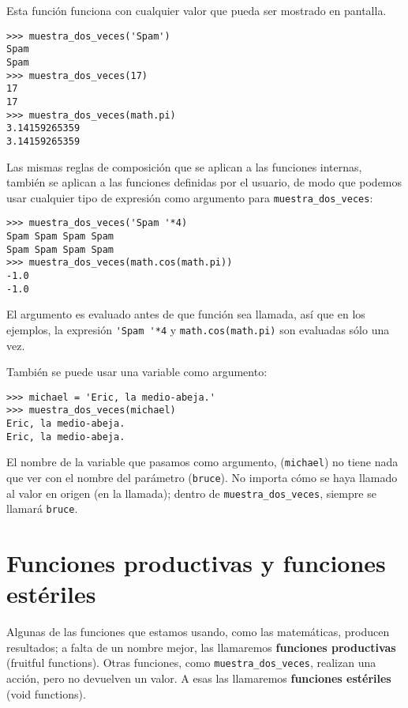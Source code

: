 Esta función funciona con cualquier valor que pueda ser mostrado en pantalla.

\beforeverb
\begin{verbatim}
>>> muestra_dos_veces('Spam')
Spam
Spam
>>> muestra_dos_veces(17)
17
17
>>> muestra_dos_veces(math.pi)
3.14159265359
3.14159265359
\end{verbatim}
\afterverb
%
Las mismas reglas de composición que se aplican a las funciones internas, también
se aplican a las funciones definidas por el usuario, de modo que podemos usar cualquier tipo
de expresión como argumento para \verb"muestra_dos_veces":


\beforeverb
\begin{verbatim}
>>> muestra_dos_veces('Spam '*4)
Spam Spam Spam Spam
Spam Spam Spam Spam
>>> muestra_dos_veces(math.cos(math.pi))
-1.0
-1.0
\end{verbatim}
\afterverb
%
El argumento es evaluado antes de que función sea llamada, así
que en los ejemplos, la expresión \verb"'Spam '*4" y
{\tt math.cos(math.pi)} son evaluadas sólo una vez.


También se puede usar una variable como argumento:

\beforeverb
\begin{verbatim}
>>> michael = 'Eric, la medio-abeja.'
>>> muestra_dos_veces(michael)
Eric, la medio-abeja.
Eric, la medio-abeja.
\end{verbatim}
\afterverb
%
El nombre de la variable que pasamos como argumento, ({\tt michael}) no
tiene nada que ver con el nombre del parámetro ({\tt bruce}). No
importa cómo se haya llamado al valor en origen (en la llamada);
dentro de \verb"muestra_dos_veces", siempre se llamará {\tt bruce}.

\section{Funciones productivas y funciones estériles}


Algunas de las funciones que estamos usando, como las matemáticas, producen
resultados; a falta de un nombre mejor, las llamaremos {\bf funciones productivas} (fruitful functions).
Otras funciones, como \verb"muestra_dos_veces", realizan una
acción, pero no devuelven un valor. A esas las llamaremos {\bf funciones
estériles} (void functions).

